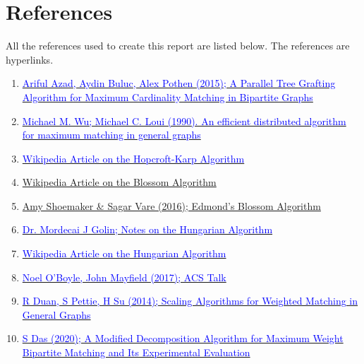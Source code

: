 \documentclass[oneside]{book}
\begin{document}
\chapter*{References}
All the references used to create this report are listed below. The references are hyperlinks.
\begin{enumerate}
    \item \href{https://people.eecs.berkeley.edu/~aydin/matchingGraft.pdf}{\textcolor{blue}{Ariful Azad, Aydin Buluc, Alex Pothen (2015); A Parallel Tree Grafting Algorithm for Maximum Cardinality Matching in Bipartite Graphs}}
    \item \href{https://link.springer.com/article/10.1007\%2FBF01840395}{\textcolor{blue}{Michael M. Wu; Michael C. Loui (1990). An efficient distributed algorithm for maximum matching in general graphs}}
    \item \href{https://en.wikipedia.org/wiki/Hopcroft\%E2\%80\%93Karp_algorithm}{\textcolor{blue}{Wikipedia Article on the Hopcroft-Karp Algorithm}}
    \item \href{https://en.wikipedia.org/wiki/Blossom_algorithm}{\color{blue} Wikipedia Article on the Blossom Algorithm}
    \item \href{https://stanford.edu/~rezab/classes/cme323/S16/projects_reports/shoemaker_vare.pdf}{\color{blue} Amy Shoemaker \& Sagar Vare (2016); Edmond's Blossom Algorithm}
    \item \href{http://www.cse.ust.hk/~golin/COMP572/Notes/Matching.pdf}{\textcolor{blue}{Dr. Mordecai J Golin; Notes on the Hungarian Algorithm}}
    \item \href{https://en.wikipedia.org/wiki/Hungarian_algorithm}{\textcolor{blue}{Wikipedia Article on the Hungarian Algorithm}}
    \item \href{https://baoilleach.blogspot.com/2017/08/my-acs-talk-on-kekulization-and.html}{\textcolor{blue}{Noel O'Boyle, John Mayfield (2017); ACS Talk}}
    \item \href{https://arxiv.org/pdf/1411.1919.pdf}{\textcolor{blue}{R Duan, S Pettie, H Su (2014); Scaling Algorithms for Weighted Matching in General Graphs}}
    \item \href{https://www.researchgate.net/publication/343998266_A_Modified_Decomposition_Algorithm_for_Maximum_Weight_Bipartite_Matching_and_Its_Experimental_Evaluation}{\textcolor{blue}{S Das (2020); A Modified Decomposition Algorithm for Maximum Weight Bipartite Matching and Its Experimental Evaluation}}
\end{enumerate}
\end{document}
